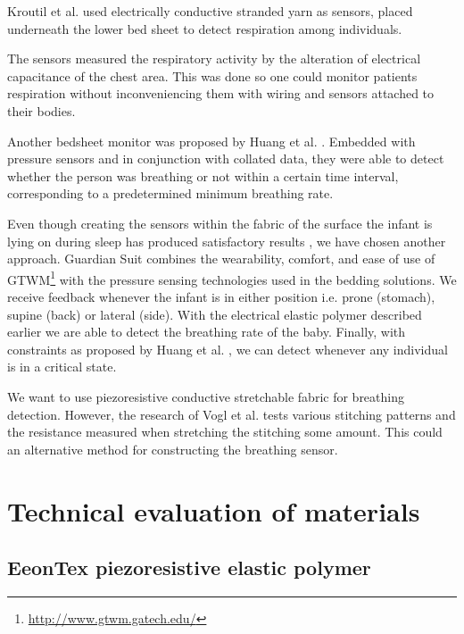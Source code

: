 \documentclass{sigchi-ext}
\begin{document}
Kroutil et al. \cite{a33-kroutil} used electrically conductive stranded yarn as sensors, placed underneath the lower bed sheet to detect respiration among individuals.

The sensors measured the respiratory activity by the alteration of electrical capacitance of the chest area. This was done so one could monitor patients respiration without inconveniencing them with wiring and sensors attached to their bodies.

Another bedsheet monitor was proposed by Huang et al. \cite{a18-huang}. Embedded with pressure sensors and in conjunction with collated data, they were able to detect whether the person was breathing or not within a certain time interval, corresponding to a predetermined minimum breathing rate.

Even though creating the sensors within the fabric of the surface the infant is lying on during sleep has produced satisfactory results \cite{a18-huang, a33-kroutil}, we have chosen another approach. Guardian Suit combines the wearability, comfort, and ease of use of GTWM\footnote{\url{http://www.gtwm.gatech.edu/}} \cite{p285-fantauzzacoffin} with the pressure sensing technologies used in the bedding solutions. We receive feedback whenever the infant is in either position i.e. prone (stomach), supine (back) or lateral (side). With the electrical elastic polymer described earlier we are able to detect the breathing rate of the baby. Finally, with constraints as proposed by Huang et al. \cite{a18-huang}, we can detect whenever any individual is in a critical state.

We want to use piezoresistive conductive
stretchable fabric for breathing detection. However, the
research of Vogl et al. \cite{stretcheband}
tests various stitching patterns and the resistance measured
when stretching the stitching some amount. This could an
alternative method for constructing the breathing sensor.


\clearpage

\section{Technical evaluation of materials}

\subsection{EeonTex piezoresistive elastic polymer}
\end{document}

